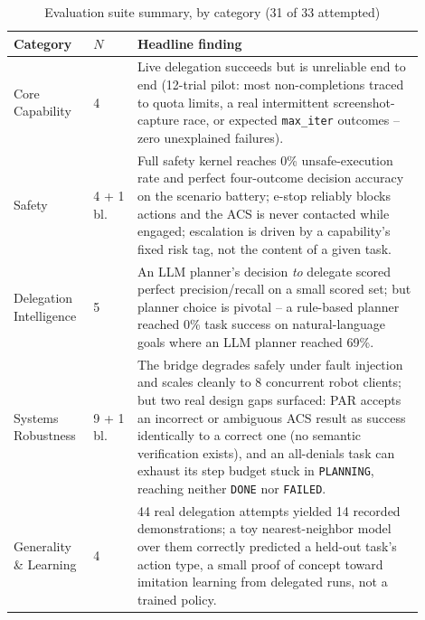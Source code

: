 \documentclass[conference]{IEEEtran}
\begin{document}
\begin{table}[t]
\centering
\caption{Evaluation suite summary, by category (31 of 33 attempted)}
\label{tab:suite}
\small
\begin{tabular}{@{}p{0.15\linewidth}p{0.10\linewidth}p{0.65\linewidth}@{}}
\toprule
Category & $N$ & Headline finding \\
\midrule
Core Capability & 4 & Live delegation succeeds but is unreliable end to end (12-trial pilot: most non-completions traced to quota limits, a real intermittent screenshot-capture race, or expected \texttt{max\_iter} outcomes -- zero unexplained failures). \\
Safety & 4 + 1 bl. & Full safety kernel reaches 0\% unsafe-execution rate and perfect four-outcome decision accuracy on the scenario battery; e-stop reliably blocks actions and the ACS is never contacted while engaged; escalation is driven by a capability's fixed risk tag, not the content of a given task. \\
Delegation Intelligence & 5 & An LLM planner's decision \emph{to} delegate scored perfect precision/recall on a small scored set; but planner choice is pivotal -- a rule-based planner reached 0\% task success on natural-language goals where an LLM planner reached 69\%. \\
Systems Robustness & 9 + 1 bl. & The bridge degrades safely under fault injection and scales cleanly to 8 concurrent robot clients; but two real design gaps surfaced: PAR accepts an incorrect or ambiguous ACS result as success identically to a correct one (no semantic verification exists), and an all-denials task can exhaust its step budget stuck in \texttt{PLANNING}, reaching neither \texttt{DONE} nor \texttt{FAILED}. \\
Generality \& Learning & 4 & 44 real delegation attempts yielded 14 recorded demonstrations; a toy nearest-neighbor model over them correctly predicted a held-out task's action type, a small proof of concept toward imitation learning from delegated runs, not a trained policy. \\
\bottomrule
\end{tabular}
\end{table}
\end{document}
